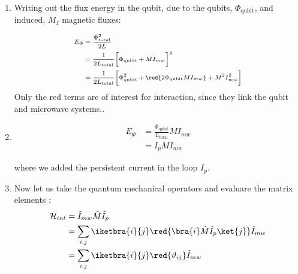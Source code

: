 \begin{minipage}{0.48\linewidth}
  \begin{enumerate}
  \item Writing out  the flux energy in the  qubit, due to the qubits,  $ \Phi_\text{qubit} $,
    and induced, $ M_I $ magnetic fluxes:
	
    \begin{equation}\label{eq:couple8}{\scriptsize
      \begin{aligned}
        E_\Phi &= \frac{\Phi_\text{total}^2}{2L}\\
        & = \frac{1}{2L_{\text{total}}}\bigg[\Phi_\text{qubit} + MI_{mw}\bigg]^2\\
        &        =       \frac{1}{2L_\text{total}}\bigg[\Phi_\text{qubit}^2        +
        \red{2\Phi_\text{qubit}MI_{mw}} + M^2I_{mw}^2\bigg]
      \end{aligned}}
  \end{equation}
  \noindent Only the red terms are of interest  for interaction, since they link the qubit and
  microwave systems..
	
\item \begin{equation}\label{eq:couple9}
    \begin{aligned}
      E_\Phi &= \frac{\Phi_\text{qubit}}{L_\text{total}}MI_{mw}\\
      & = I_pMI_{mw}
    \end{aligned}
  \end{equation}
	
  \noindent where we added the persistent current in the loop $ I_p $.

\item  Now let  us take  the quantum  mechanical operators  and evaluare  the matrix  elements
  \cite{Astafiev2010}:
  \begin{equation}\label{eqn:dipole_1}
    \begin{aligned}
      \mathcal{H}_{int} & = \hat{I}_{mw}\hat{M}\hat{I}_p\\
      & = \sum_{i,j}\iketbra{i}{j}\red{\bra{i}\hat{M}\hat{I}_p\ket{j}} \hat{I}_{mw}\\
      & = \sum_{i,j}\iketbra{i}{j}\red{\vartheta_{ij}} \hat{I}_{mw}\\
    \end{aligned}
  \end{equation}
  

\end{enumerate}
\end{minipage}
